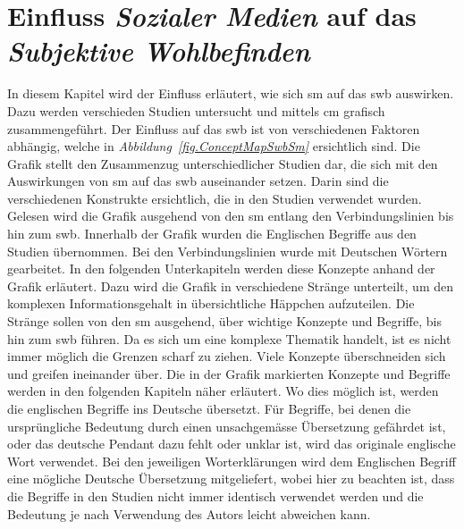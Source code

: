 %
%
\thispagestyle{empty}
\chapter{Einfluss \textit{Sozialer Medien} auf das \textit{Subjektive Wohlbefinden}}\label{chap.einfluss}
\glsresetall
In diesem Kapitel wird der Einfluss erläutert, wie sich \gls{sm} auf das \gls{swb} auswirken. Dazu werden verschieden Studien untersucht und mittels \gls{cm} grafisch zusammengeführt. Der Einfluss auf das \gls{swb} ist von verschiedenen Faktoren abhängig, welche in \textit{Abbildung~\ref{fig.ConceptMapSwbSm}} ersichtlich sind.\newline
Die Grafik stellt den Zusammenzug unterschiedlicher Studien dar, die sich mit den Auswirkungen von \gls{sm} auf das \gls{swb} auseinander setzen. Darin sind die verschiedenen Konstrukte ersichtlich, die in den Studien verwendet wurden. Gelesen wird die Grafik ausgehend von den \gls{sm} entlang den Verbindungslinien bis hin zum \gls{swb}.\newline
Innerhalb der Grafik wurden die Englischen Begriffe aus den Studien übernommen. Bei den Verbindungslinien wurde mit Deutschen Wörtern gearbeitet.\newline
In den folgenden Unterkapiteln werden diese Konzepte anhand der Grafik erläutert. Dazu wird die Grafik in verschiedene Stränge unterteilt, um den komplexen Informationsgehalt in übersichtliche Häppchen aufzuteilen. Die Stränge sollen von den \gls{sm} ausgehend, über wichtige Konzepte und Begriffe, bis hin zum \gls{swb} führen. Da es sich um eine komplexe Thematik handelt, ist es nicht immer möglich die Grenzen scharf zu ziehen. Viele Konzepte überschneiden sich und greifen ineinander über.\newline 
Die in der Grafik markierten Konzepte und Begriffe werden in den folgenden Kapiteln näher erläutert. Wo dies möglich ist, werden die englischen Begriffe ins Deutsche übersetzt. Für Begriffe, bei denen die ursprüngliche Bedeutung durch einen unsachgemässe Übersetzung gefährdet ist, oder das deutsche Pendant dazu fehlt oder unklar ist, wird das originale englische Wort verwendet. Bei den jeweiligen Worterklärungen wird dem Englischen Begriff eine mögliche Deutsche Übersetzung mitgeliefert, wobei hier zu beachten ist, dass die Begriffe in den Studien nicht immer identisch verwendet werden und die Bedeutung je nach Verwendung des Autors leicht abweichen kann.\newline 

